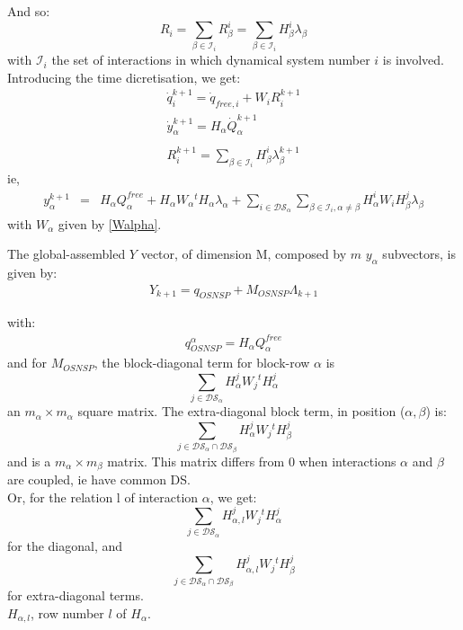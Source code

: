 \documentclass[10pt]{report}
\begin{document}
And so:
\begin{equation}
R_i = \sum_{\beta\in\mathcal{I}_i}R_{\beta}^i=\sum_{\beta\in\mathcal{I}_i}{}H^i_{\beta} \lambda_{\beta}
\end{equation}
with $\mathcal{I}_i$ the set of interactions in which dynamical system number $i$ is involved. \\
Introducing the time dicretisation, we get:
\begin{eqnarray}
\dot q_i^{k+1} = \dot q_{free,i} + W_iR_i^{k+1}
\nonumber\\
\dot y_{\alpha}^{k+1} = H_{\alpha}\dot Q_{\alpha}^{k+1} \\
\nonumber\\
R_i^{k+1} = \sum_{\beta\in\mathcal{I}_i}H^i_{\beta} \lambda_{\beta}^{k+1}
\end{eqnarray}
ie,
\begin{eqnarray}
  y_{\alpha}^{k+1} &=& H_{\alpha} Q_{\alpha}^{free} + H_{\alpha}W_{\alpha}{}^tH_{\alpha}\lambda_{\alpha}+\sum_{i\in \mathcal{DS}_{\alpha}}\sum_{\beta\in\mathcal{I}_i,\alpha\neq\beta}H_{\alpha}^iW_iH_{\beta}^j\lambda_{\beta}
\end{eqnarray}
with $W_{\alpha}$ given by \eqref{Walpha}.

The global-assembled $Y$ vector, of dimension M, composed by $m$ $y_{\alpha}$ subvectors, is given by:
\begin{eqnarray}
Y_{k+1} = q_{OSNSP} + M_{OSNSP}\Lambda_{k+1}
\end{eqnarray}

with:
\begin{eqnarray}
q_{OSNSP}^{\alpha} = H_{\alpha} Q_{\alpha}^{free}
\end{eqnarray}
and for $M_{OSNSP}$, the block-diagonal term for block-row $\alpha$ is
\begin{equation}
\sum_{j\in \mathcal{DS}_{\alpha}}H_{\alpha}^jW_j{}^tH_{\alpha}^j
\end{equation}
an $m_{\alpha}\times m_{\alpha}$ square matrix.
The extra-diagonal block term, in position ($\alpha,\beta$) is:
\begin{equation}
\sum_{j\in \mathcal{DS}_{\alpha}\cap\mathcal{DS}_{\beta}}H_{\alpha}^jW_j{}^tH_{\beta}^j
\end{equation}
and is a $m_{\alpha}\times m_{\beta}$ matrix. This matrix differs from 0 when interactions $\alpha$ and $\beta$ are coupled, ie have common DS. \\

Or, for the relation l of interaction $\alpha$, we get:
\begin{equation}
\sum_{j\in \mathcal{DS}_{\alpha}}H_{\alpha,l}^jW_j{}^tH_{\alpha}^j
\end{equation}
for the diagonal, and
\begin{equation}
\sum_{j\in \mathcal{DS}_{\alpha}\cap\mathcal{DS}_{\beta}}H_{\alpha,l}^jW_j{}^tH_{\beta}^j
\end{equation}
for extra-diagonal terms. \\
$H_{\alpha,l}$, row number $l$ of $H_{\alpha}$.
\end{document}
